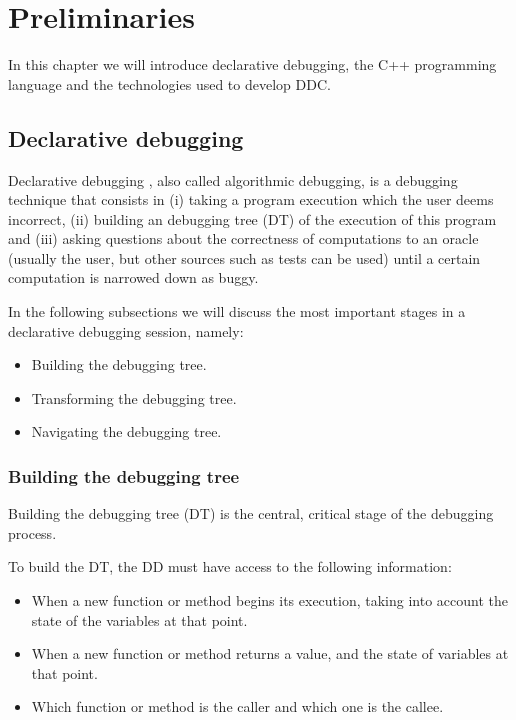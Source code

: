 \chapter{Preliminaries}
\label{cap:preliminares}

In this chapter we will introduce declarative debugging, the C++ programming language and the technologies used to develop DDC.

\section{Declarative debugging}
Declarative debugging \cite{shapiro1982algorithmic}, also called algorithmic debugging, is a debugging technique that consists in (i) taking a program execution which the user deems incorrect, (ii) building an debugging tree (DT) of the execution of this program and (iii) asking questions about the correctness of computations to an oracle (usually the user, but other sources such as tests can be used) until a certain computation is narrowed down as buggy.

In the following subsections we will discuss the most important stages in a declarative debugging session, namely:
\begin{itemize}
    \item Building the debugging tree.
    \item Transforming the debugging tree.
    \item Navigating the debugging tree.
\end{itemize}
\subsection{Building the debugging tree}

Building the debugging tree (DT) is the central, critical stage of the debugging process.

To build the DT, the DD must have access to the following information:
\begin{itemize}
    \item When a new function or method begins its execution, taking into account the state of the variables at that point.
    \item When a new function or method returns a value, and the state of variables at that point.
    \item Which function or method is the caller and which one is the callee.
\end{itemize}

